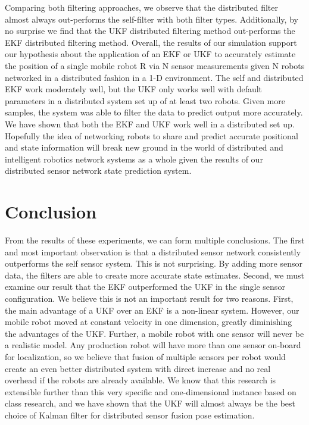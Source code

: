 \documentclass[conference]{IEEEtran} \usepackage[T1]{fontenc} \usepackage[backend=biber, style=ieee]{biblatex}
\begin{document}
Comparing both filtering approaches, we observe that the distributed filter almost always out-performs the self-filter 
with both filter types. Additionally, by no surprise we find that the UKF distributed filtering method out-performs the EKF distributed
filtering method. Overall, the results of our simulation support our hypothesis about the application of an EKF or UKF to accurately
estimate the position of a single mobile robot R via N sensor measurements given N robots networked in a distributed fashion in a 1-D environment. 
The self and distributed EKF work moderately well, but the UKF only works well with default parameters in a distributed system set up of at least 
two robots. Given more samples, the system was able to filter the data to predict output more accurately. We have shown that both the EKF 
and UKF work well in a distributed set up. Hopefully the idea of networking robots to share and predict accurate positional and state information will break new ground in the world of distributed and intelligent robotics network systems as a whole given the results of our distributed sensor network state prediction
system.

\section{Conclusion} \label{Conclusion} 
From the results of these experiments, we can form multiple conclusions. The first and most important observation is that a distributed sensor network consistently 
outperforms the self sensor system. This is not surprising. By adding more sensor data, the filters are able to create more accurate state estimates. Second, we 
must examine our result that the EKF outperformed the UKF in the single sensor configuration. We believe this is not an important result for two reasons. First, the 
main advantage of a UKF over an EKF is a non-linear system. However, our mobile robot moved at constant velocity in one dimension, greatly diminishing the 
advantages of the UKF. Further, a mobile robot with one sensor will never be a realistic model. Any production robot will have more than one sensor on-board for 
localization, so we believe that fusion of multiple sensors per robot would create an even better distributed system with direct increase and no real overhead if 
the robots are already available. We know that this research is extensible further than this very specific and one-dimensional instance based on class research, and 
we have shown that the UKF will almost always be the best choice of Kalman filter for distributed sensor fusion pose estimation.
\end{document}
